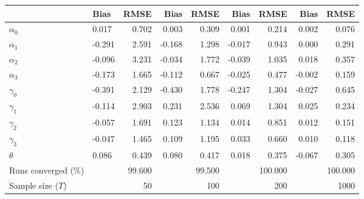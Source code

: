 
\begin{tabular}[t]{llrrrrrrr}
\toprule
  & Bias & RMSE & Bias & RMSE & Bias & RMSE & Bias & RMSE\\
\midrule
$\alpha_{0}$ & 0.017 & 0.702 & 0.003 & 0.309 & 0.001 & 0.214 & 0.002 & 0.076\\
$\alpha_{1}$ & -0.291 & 2.591 & -0.168 & 1.298 & -0.017 & 0.943 & 0.000 & 0.291\\
$\alpha_{2}$ & -0.096 & 3.231 & -0.034 & 1.772 & -0.039 & 1.035 & 0.018 & 0.357\\
$\alpha_{3}$ & -0.173 & 1.665 & -0.112 & 0.667 & -0.025 & 0.477 & -0.002 & 0.159\\
$\gamma_{0}$ & -0.391 & 2.129 & -0.430 & 1.778 & -0.247 & 1.304 & -0.027 & 0.645\\
$\gamma_{1}$ & -0.114 & 2.903 & 0.231 & 2.536 & 0.069 & 1.304 & 0.025 & 0.234\\
$\gamma_{2}$ & -0.057 & 1.691 & 0.123 & 1.134 & 0.014 & 0.851 & 0.012 & 0.151\\
$\gamma_{3}$ & -0.047 & 1.465 & 0.109 & 1.195 & 0.033 & 0.660 & 0.010 & 0.118\\
$\theta$ & 0.086 & 0.439 & 0.080 & 0.417 & 0.018 & 0.375 & -0.067 & 0.305\\
Runs converged (\%) &  & 99.600 &  & 99.500 &  & 100.000 &  & 100.000\\
Sample size ($T$) &  & 50 &  & 100 &  & 200 &  & 1000\\
\bottomrule
\end{tabular}
